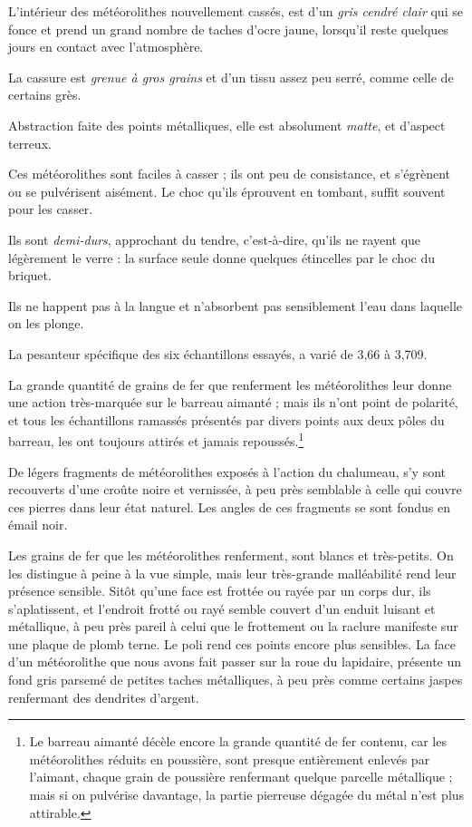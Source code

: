 \documentclass[a4paper, 12pt, oneside, french]{article}
\begin{document}
\og L'intérieur des météorolithes nouvellement cassés, est d'un \emph{gris cendré clair} qui se fonce et prend un grand nombre de taches d'ocre jaune, lorsqu'il reste quelques jours en contact avec l'atmosphère. \fg

\og La cassure est \emph{grenue à gros grains} et d'un tissu assez peu serré, comme celle de certains grès. \fg

\og Abstraction faite des points métalliques, elle est absolument \emph{matte}, et d'aspect terreux. \fg

\og Ces météorolithes sont faciles à casser ; ils ont peu de consistance, et s'égrènent ou se pulvérisent aisément. Le choc qu'ils éprouvent en tombant, suffit souvent pour les casser. \fg

\og Ils sont \emph{demi-durs}, approchant du tendre, c'est-à-dire, qu'ils ne rayent que légèrement le verre : la surface seule donne quelques étincelles par le choc du briquet. \fg

\og Ils ne happent pas à la langue et n'absorbent pas sensiblement l'eau dans laquelle on les plonge. \fg

\og La pesanteur spécifique des six échantillons essayés, a varié de 3,66 à 3,709. \fg

\og La grande quantité de grains de fer que renferment les météorolithes leur donne une action très-marquée sur le barreau aimanté ; mais ils n'ont point de polarité, et tous les échantillons ramassés présentés par divers points aux deux pôles du barreau, les ont toujours attirés et jamais repoussés.\footnote{\og Le barreau aimanté décèle encore la grande quantité de fer contenu, car les météorolithes réduits en poussière, sont presque entièrement enlevés par l'aimant, chaque grain de poussière renfermant quelque parcelle métallique ; mais si on pulvérise davantage, la partie pierreuse dégagée du métal n'est plus attirable. \fg} \fg

\og De légers fragments de météorolithes exposés à l'action du chalumeau, s'y sont recouverts d'une croûte noire et vernissée, à peu près semblable à celle qui couvre ces pierres dans leur état naturel. Les angles de ces fragments se sont fondus en émail noir. \fg

\og Les grains de fer que les météorolithes renferment, sont blancs et très-petits. On les distingue à peine à la vue simple, mais leur très-grande malléabilité rend leur présence sensible. Sitôt qu'une face est frottée ou rayée par un corps dur, ils s'aplatissent, et l'endroit frotté ou rayé semble couvert d'un enduit luisant et métallique, à peu près pareil à celui que le frottement ou la raclure manifeste sur une plaque de plomb terne. Le poli rend ces points encore plus sensibles. La face d'un météorolithe que nous avons fait passer sur la roue du lapidaire, présente un fond gris parsemé de petites taches métalliques, à peu près comme certains jaspes renfermant des dendrites d'argent. \fg
\end{document}
